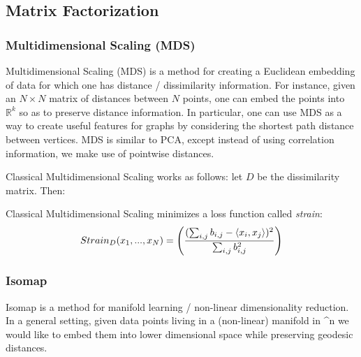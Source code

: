 \subsection{Matrix Factorization}
\subsubsection*{Multidimensional Scaling (MDS)}
Multidimensional Scaling (MDS) is a method for creating a Euclidean embedding of data for which one has distance / dissimilarity information. For instance, given an $N \times N$ matrix of distances between $N$ points, one can embed the points into $\mathbb{R}^k$ so as to preserve distance information. In particular, one can use MDS as a way to create useful features for graphs by considering the shortest path distance between vertices. MDS is similar to PCA, except instead of using correlation information, we make use of pointwise distances.

Classical Multidimensional Scaling works as follows: let $D$ be the dissimilarity matrix. Then:



Classical Multidimensional Scaling minimizes a loss function called \emph{strain}:
\[
    Strain_D(x_1, ... , x_N) = \left( ({\sum_{i,j}b_{i,j}- \langle x_i,x_j \rangle})^2 \over \sum_{i,j}b_{i,j}^2\right)
\]


\subsubsection*{Isomap}
Isomap is a method for manifold learning / non-linear dimensionality reduction. In a general setting, given data points living in a (non-linear) manifold in ^n we would like to embed them into lower dimensional space while preserving geodesic distances.
